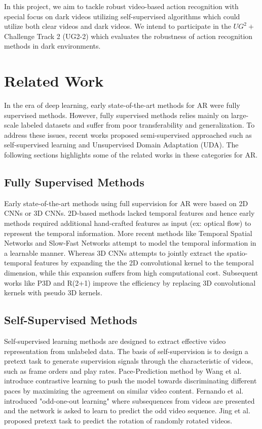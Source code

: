 \documentclass[conference]{IEEEtran}
\begin{document}
In this project, we aim to tackle robust video-based action recognition with special focus on dark videos utilizing self-supervised algorithms which could utilize both clear videos and dark videos. We intend to participate in the $UG^{2}+$ Challenge Track 2 (UG2-2)\cite{UG2-2} which evaluates the robustness of action recognition methods in dark environments.

\section{Related Work}
In the era of deep learning, early state-of-the-art methods for AR were fully supervised methods. However, fully supervised methods relies mainly on large-scale labeled datasets and suffer from poor transferability and generalization. To address these issues, recent works proposed semi-supervised approached such as self-supervised learning and Unsupervised Domain Adaptation (UDA). The following sections highlights some of the related works in these categories for AR.

\subsection{Fully Supervised Methods}
Early state-of-the-art methods using full supervision for AR were based on 2D CNNs\cite{Karpathy2014LargeScaleVC} or 3D CNNs\cite{Ji20133DCN}. 2D-based methods lacked temporal features and hence early methods \cite{Simonyan2014TwoStreamCN} required additional hand-crafted features as input (ex: optical flow) to represent the temporal information. More recent methods like Temporal Spatial Networks \cite{Wang2016TemporalSN} and Slow-Fast Networks \cite{Feichtenhofer2019SlowFastNF} attempt to model the temporal information in a learnable manner. Whereas 3D CNNs attempts to jointly extract the spatio-temporal features by expanding the the 2D convolutional kernel to the temporal dimension, while this expansion suffers from high computational cost. Subsequent works like P3D \cite{Qiu2017LearningSR} and R(2+1) \cite{Tran2018ACL} improve the efficiency by replacing 3D convolutional kernels with pseudo 3D kernels.

\subsection{Self-Supervised Methods}
Self-supervised learning methods are designed to extract effective video representation from unlabeled data. The basis of self-supervision is to design a pretext task to generate supervision signals through the characteristic of videos, such as frame orders and play rates. Pace-Prediction method by Wang et al.\cite{Wang2020SelfsupervisedVR} introduce contrastive learning to push the model towards discriminating different paces by maximizing the agreement on similar video content. Fernando et al. introduced "odd-one-out learning" \cite{Fernando2017SelfSupervisedVR} where subsequences from videos are presented and the network is asked to learn to predict the odd video sequence. Jing et al. \cite{Jing2018SelfSupervisedSF} proposed  pretext task to predict the rotation of randomly rotated videos.
\end{document}
